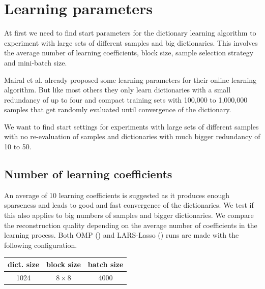 \section{Learning parameters}
At first we need to find start parameters for the dictionary learning
algorithm to experiment with large sets of different samples and big
dictionaries. This involves the average number of learning
coefficients, block size, sample selection strategy and mini-batch size.

Mairal et al. already proposed some learning parameters for their online
learning algorithm. But like most others they only learn dictionaries with
a small redundancy of up to four and compact training sets with 100,000
to 1,000,000 samples that get randomly evaluated until convergence of the
dictionary.

We want to find start settings for experiments with large sets of
different samples with no re-evaluation of samples and dictionaries
with much bigger redundancy of 10 to 50.

\subsection{Number of learning coefficients}
An average of 10 learning coefficients is suggested as it produces enough
sparseness and leads to good and fast convergence of the dictionaries.
We test if this also applies to big numbers of samples and bigger
dictionaries. We compare the reconstruction quality depending on the average
number of coefficients in the learning process. 
Both OMP () and LARS-Lasso
() runs are made with the following
configuration.
\begin{table}[H]
\centering
\begin{tabular}{| c | c | c |}
\hline
\hline
dict. size & block size & batch size \\
\hline
1024 & $8\times 8$ & 4000  \\
\hline
\end{tabular}
\end{table}


